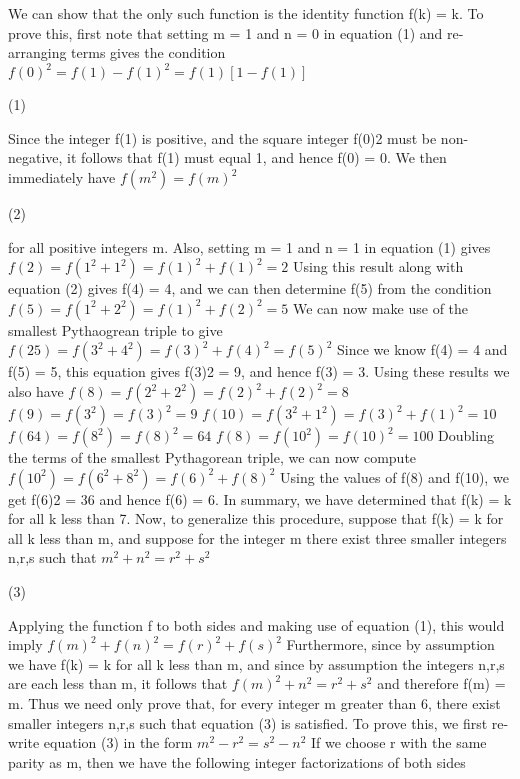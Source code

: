 \begin{solution}
	We can show that the only such function is the identity function f(k) = k. To prove this, first note that setting m = 1 and n = 0 in equation (1) and re-arranging terms gives the condition
$f(0)^2=f(1)-f(1)^2=f(1)[1-f(1)]$              \begin{bolded}(1)\end{bolded}
Since the integer f(1) is positive, and the square integer f(0)2 must be non-negative, it follows that f(1) must equal 1, and hence f(0) = 0. We then immediately have
$f(m^2)=f(m)^2$                    \begin{bolded}(2)\end{bolded}
for all positive integers m. Also, setting m = 1 and n = 1 in equation (1) gives
$f(2)=f(1^2+1^2)=f(1)^2+f(1)^2=2$
Using this result along with equation (2) gives f(4) = 4, and we can then determine f(5) from the condition
$f(5)=f(1^2+2^2)=f(1)^2+f(2)^2=5$
We can now make use of the smallest Pythaogrean triple to give
$f(25)=f(3^2+4^2)=f(3)^2+f(4)^2=f(5)^2$
Since we know f(4) = 4 and f(5) = 5, this equation gives f(3)2 = 9, and hence f(3) = 3. Using these results we also have
$f(8)=f(2^2+2^2)=f(2)^2+f(2)^2=8$
$f(9)=f(3^2)=f(3)^2=9$
$f(10)=f(3^2+1^2)=f(3)^2+f(1)^2=10$
$f(64)=f(8^2)=f(8)^2=64$
$f(8)=f(10^2)=f(10)^2=100$
Doubling the terms of the smallest Pythagorean triple, we can now compute
$f(10^2)=f(6^2+8^2)=f(6)^2+f(8)^2$
Using the values of f(8) and f(10), we get f(6)2 = 36 and hence f(6) = 6. In summary, we have determined that f(k) = k for all k less than 7.
Now, to generalize this procedure, suppose that f(k) = k for all k less than m, and suppose for the integer m there exist three smaller integers n,r,s such that
$m^2+n^2=r^2+s^2$                  \begin{bolded}(3)\end{bolded}
Applying the function f to both sides and making use of equation (1), this would imply
$f(m)^2+f(n)^2=f(r)^2+f(s)^2$
Furthermore, since by assumption we have f(k) = k for all k less than m, and since by assumption the integers n,r,s are each less than m, it follows that
$f(m)^2+n^2=r^2+s^2$
and therefore f(m) = m. Thus we need only prove that, for every integer m greater than 6, there exist smaller integers n,r,s such that equation (3) is satisfied. To prove this, we first re-write equation (3) in the form
$m^2-r^2=s^2-n^2$
If we choose r with the same parity as m, then we have the following integer factorizations of both sides

\end{solution}
